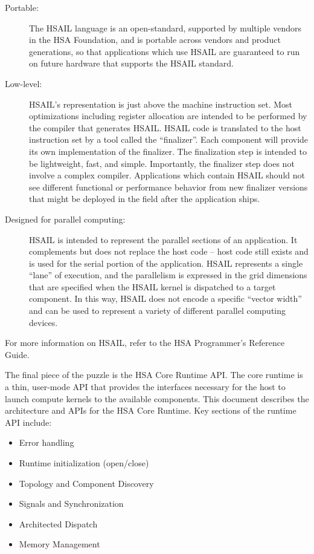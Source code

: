 \begin{description}
\item[Portable:] The HSAIL language is an open-standard, supported by
multiple vendors in the HSA Foundation, and is portable across
vendors and product generations, so that applications which use
HSAIL are guaranteed to run on future hardware that supports the
HSAIL standard.  
\item[Low-level:] HSAIL’s representation is just above the machine
instruction set.  Most optimizations including register allocation
are intended to be performed by the compiler that generates HSAIL.
HSAIL code is translated to the host instruction set by a tool
called the “finalizer”.  Each component will provide its own
implementation of the finalizer.  The finalization step is intended
to be lightweight, fast, and simple.  Importantly, the finalizer
step does not involve a complex compiler.  Applications which
contain HSAIL should not see different functional or performance
behavior from new finalizer versions that might be deployed in the
field after the application ships.
\item[Designed for parallel computing:] HSAIL is intended to represent
the parallel sections of an application.  It complements but does
not replace the host code – host code still exists and is used for
the serial portion of the application.  HSAIL represents a single
“lane” of execution, and the parallelism is expressed in the grid
dimensions that are specified when the HSAIL kernel is dispatched to
a target component.  In this way, HSAIL does not encode a specific
“vector width” and can be used to represent a variety of different
parallel computing devices.
\end{description}

For more information on HSAIL, refer to the HSA Programmer’s
Reference Guide.  

The final piece of the puzzle is the HSA Core Runtime API.  The core
runtime is a thin, user-mode API that provides the interfaces
necessary for the host to launch compute kernels to the available
components.  This document describes the architecture and APIs for
the HSA Core Runtime.  Key sections of the runtime API include:

\begin{itemize}
\item Error handling
\item Runtime initialization (open/close)
\item Topology and Component Discovery
\item Signals and Synchronization
\item Architected Dispatch
\item Memory Management
\end{itemize}

